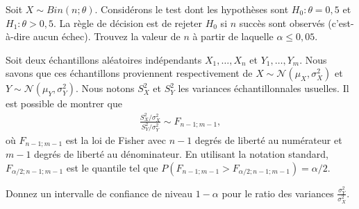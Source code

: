 \begin{questions}
Soit $X\sim Bin(n;\theta)$. Considérons le test dont les hypothèses sont $H_0:\theta =0,5$ et $H_1:\theta>0,5$. 
La règle de décision est de rejeter $H_0$ si $n$ succès sont observés (c'est-à-dire aucun échec).
Trouvez la valeur de $n$ à partir de laquelle $\alpha\leq 0,05$.

\pageblanche
\bonusquestion[4] Soit deux échantillons aléatoires indépendants $X_1,\hdots,X_n$ et $Y_1,\hdots,Y_m$. 
    Nous savons que ces échantillons proviennent respectivement de $X\sim\mathcal{N}(\mu_X,\sigma^2_X)$ et $Y\sim\mathcal{N}(\mu_Y, \sigma^2_Y)$. 
    Nous notons $S_X^2$ et $S_Y^2$ les variances échantillonnales usuelles.
    Il est possible de montrer que 
    \begin{align*}
        \frac{S_X^2/\sigma^2_X}{S_Y^2/\sigma^2_Y}\sim F_{n-1;m-1},
    \end{align*}
    où $F_{n-1;m-1}$ est la loi de Fisher avec $n-1$ degrés de liberté au numérateur et $m-1$ degrés de liberté au dénominateur.
    En utilisant la notation standard, $F_{\alpha/2;n-1;m-1}$ est le quantile tel que $P(F_{n-1;m-1}>F_{\alpha/2;n-1;m-1})=\alpha/2$.
    
    Donnez un intervalle de confiance de niveau $1-\alpha$ pour le ratio des variances $\displaystyle\frac{\sigma^2_Y}{\sigma^2_X}$.
    


\pageblanche

\end{questions}
